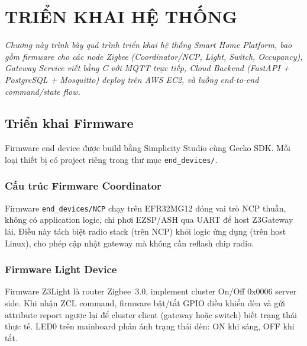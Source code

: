 \chapter{TRIỂN KHAI HỆ THỐNG}
\label{ch:trienkhai}

\vspace{0.5cm}
\noindent\textit{Chương này trình bày quá trình triển khai hệ thống
Smart Home Platform, bao gồm firmware cho các node Zigbee
(Coordinator/NCP, Light, Switch, Occupancy), Gateway Service viết
bằng C với MQTT trực tiếp, Cloud Backend (FastAPI + PostgreSQL +
Mosquitto) deploy trên AWS EC2, và luồng end-to-end command/state
flow.}
\vspace{0.5cm}

\section{Triển khai Firmware}
\label{sec:ch3-firmware}

Firmware end device được build bằng Simplicity Studio cùng Gecko SDK.
Mỗi loại thiết bị có project riêng trong thư mục
\texttt{end\_devices/}.

\subsection{Cấu trúc Firmware Coordinator}
\label{sec:ch3-coordinator-modules}

Firmware \texttt{end\_devices/NCP} chạy trên EFR32MG12 đóng vai trò
NCP thuần, không có application logic, chỉ phơi EZSP/ASH qua UART
để host Z3Gateway lái. Điều này tách biệt radio stack (trên NCP)
khỏi logic ứng dụng (trên host Linux), cho phép cập nhật gateway mà
không cần reflash chip radio.

\subsection{Firmware Light Device}
\label{sec:ch3-light-modules}

Firmware Z3Light là router Zigbee~3.0, implement cluster On/Off 0x0006
server side. Khi nhận ZCL command, firmware bật/tắt GPIO điều khiển
đèn và gửi attribute report ngược lại để cluster client (gateway hoặc
switch) biết trạng thái thực tế. LED0 trên mainboard phản ánh trạng
thái đèn: ON khi sáng, OFF khi tắt.

